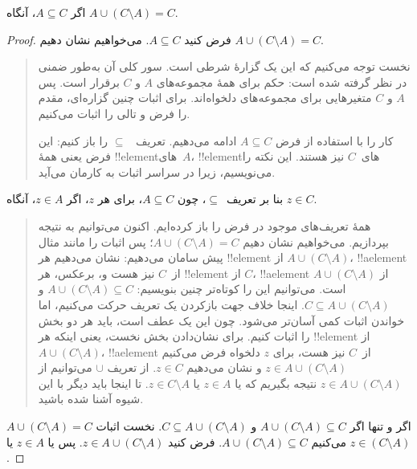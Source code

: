 \documentclass[../../../include/open-logic-section]{subfiles}
\begin{document}


\begin{prop}
اگر $A \subseteq C$، آنگاه $A \cup (C \setminus A) = C$.
\end{prop}

\begin{proof}
  فرض کنید $A \subseteq C$. می‌خواهیم نشان دهیم
  $A \cup (C \setminus A) = C$.
  \begin{quote}
    نخست توجه می‌کنیم که این یک گزارهٔ شرطی است. سور کلی آن به‌طور
    ضمنی در نظر گرفته شده است: حکم برای همهٔ مجموعه‌های $A$ و $C$
    برقرار است. پس $A$ و $C$ متغیرهایی برای مجموعه‌های دلخواه‌اند.
    برای اثبات چنین گزاره‌ای، مقدم را فرض و تالی را اثبات می‌کنیم.

    کار را با استفاده از فرض $A \subseteq C$ ادامه می‌دهیم. تعریف
    ~$\subseteq$ را باز کنیم: این فرض یعنی همهٔ !!{element}های~$A$،
    !!{element}های~$C$ نیز هستند. این نکته را می‌نویسیم، زیرا در سراسر
    اثبات به کارمان می‌آید.
  \end{quote}
  بنا بر تعریف~$\subseteq$، چون $A \subseteq C$، برای هر $z$، اگر
  $z \in A$، آنگاه $z \in C$.
  \begin{quote}
    همهٔ تعریف‌های موجود در فرض را باز کرده‌ایم. اکنون می‌توانیم به
    نتیجه بپردازیم. می‌خواهیم نشان دهیم $A \cup (C \setminus A) = C$؛
    پس اثبات را مانند مثال پیش سامان می‌دهیم: نشان می‌دهیم هر
    !!{element} از $A \cup (C \setminus A)$، !!a{element} از~$C$ نیز
    هست و، برعکس، هر !!{element} از $C$، !!a{element} از
    $A \cup (C \setminus A)$ است. می‌توانیم این را کوتاه‌تر چنین
    بنویسیم: $A \cup (C \setminus A) \subseteq C$ و
    $C \subseteq A \cup (C \setminus A)$. اینجا خلاف جهت بازکردن یک
    تعریف حرکت می‌کنیم، اما خواندن اثبات کمی آسان‌تر می‌شود. چون این
    یک عطف است، باید هر دو بخش را اثبات کنیم. برای نشان‌دادن بخش نخست،
    یعنی اینکه هر !!{element} از $A \cup (C \setminus A)$،
    !!a{element} از~$C$ نیز هست، برای $z$ دلخواه فرض می‌کنیم
    $z \in A \cup (C \setminus A)$ و نشان می‌دهیم $z \in C$. از تعریف
    $\cup$ می‌توانیم از $z \in A \cup (C \setminus A)$ نتیجه بگیریم
    که یا $z \in A$ یا $z \in C \setminus A$. تا اینجا باید دیگر با
    این شیوه آشنا شده باشید.
  \end{quote}
  $A \cup (C \setminus A) = C$ اگر و تنها اگر
  $A \cup (C \setminus A) \subseteq C$ و
  $C \subseteq A \cup (C \setminus A)$. نخست اثبات می‌کنیم
  $A \cup (C \setminus A) \subseteq C$. فرض کنید
  $z \in A \cup (C \setminus A)$. پس یا $z \in A$ یا
  $z \in (C \setminus A)$.

\end{proof}
\end{document}
